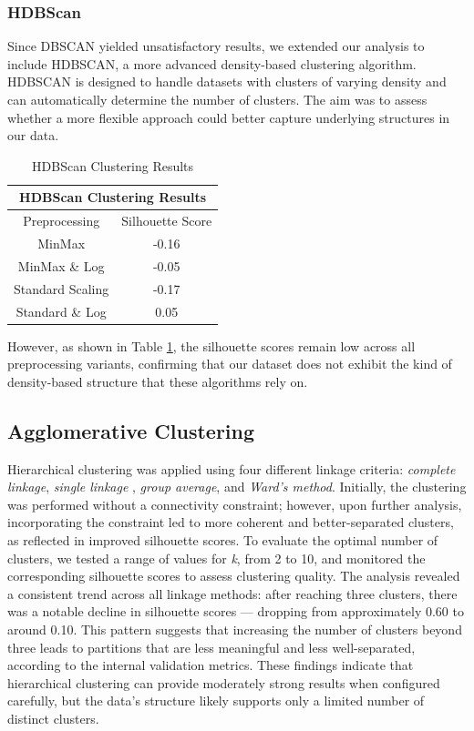 \documentclass[10pt]{article}
\begin{document}
\subsubsection{HDBScan}

Since DBSCAN yielded unsatisfactory results, we extended our analysis to include HDBSCAN, a more advanced density-based clustering algorithm. HDBSCAN is designed to handle datasets with clusters of varying density and can automatically determine the number of clusters. The aim was to assess whether a more flexible approach could better capture underlying structures in our data.

\begin{table}[ht!]
    \centering
    \begin{tabular}{|c|c|}
    \hline
    \multicolumn{2}{|c|}{HDBScan Clustering Results} \\
    \hline
     Preprocessing & Silhouette Score \\
    \hline
    MinMax & -0.16 \\
    MinMax \& Log & -0.05 \\
    Standard Scaling & -0.17 \\
    Standard \& Log & 0.05 \\
    \hline
    \end{tabular}
    \caption{HDBScan Clustering Results}
    \label{table:HDB}
\end{table}
However, as shown in Table \ref{table:HDB}, the silhouette scores remain low across all preprocessing variants, confirming that our dataset does not exhibit the kind of density-based structure that these algorithms rely on.

\subsection{Agglomerative Clustering} 
Hierarchical clustering was applied using four different linkage criteria: \textit{complete linkage}, \textit{single linkage} , \textit{group average}, and \textit{Ward’s method}. Initially, the clustering was performed without a connectivity constraint; however, upon further analysis, incorporating the constraint led to more coherent and better-separated clusters, as reflected in improved silhouette scores.\newline
To evaluate the optimal number of clusters, we tested a range of values for \textit{k}, from 2 to 10, and monitored the corresponding silhouette scores to assess clustering quality. The analysis revealed a consistent trend across all linkage methods: after reaching three clusters, there was a notable decline in silhouette scores — dropping from approximately 0.60 to around 0.10. This pattern suggests that increasing the number of clusters beyond three leads to partitions that are less meaningful and less well-separated, according to the internal validation metrics. \newline
These findings indicate that hierarchical clustering can provide moderately strong results when configured carefully, but the data’s structure likely supports only a limited number of distinct clusters.
\end{document}
